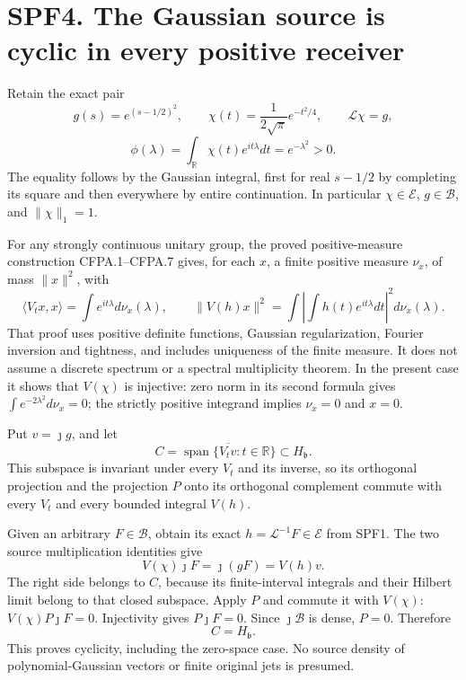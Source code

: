 \section{SPF4. The Gaussian source is cyclic in every positive
receiver}\label{spf4.-the-gaussian-source-is-cyclic-in-every-positive-receiver}

Retain the exact pair \[
g(s)=e^{(s-1/2)^2},\qquad
\chi(t)=\frac1{2\sqrt\pi}e^{-t^2/4},\qquad
\mathcal L\chi=g,
\] \[
\phi(\lambda)=\int_{\mathbb R}\chi(t)e^{it\lambda}dt
=e^{-\lambda^2}>0.
\tag{SPF4.1}
\] The equality follows by the Gaussian integral, first for real
\(s-1/2\) by completing its square and then everywhere by entire
continuation. In particular \(\chi\in\mathcal E\), \(g\in\mathcal B\),
and \(\|\chi\|_1=1\).

For any strongly continuous unitary group, the proved positive-measure
construction CFPA.1--CFPA.7 gives, for each \(x\), a finite positive
measure \(\nu_x\), of mass \(\|x\|^2\), with \[
\langle V_tx,x\rangle=\int e^{it\lambda}d\nu_x(\lambda),
\qquad
\|V(h)x\|^2=\int\left|\int h(t)e^{it\lambda}dt\right|^2d\nu_x(\lambda).
\tag{SPF4.2}
\] That proof uses positive definite functions, Gaussian regularization,
Fourier inversion and tightness, and includes uniqueness of the finite
measure. It does not assume a discrete spectrum or a spectral
multiplicity theorem. In the present case it shows that \(V(\chi)\) is
injective: zero norm in its second formula gives
\(\int e^{-2\lambda^2}d\nu_x=0\); the strictly positive integrand
implies \(\nu_x=0\) and \(x=0\).

Put \(v=\jmath g\), and let \[
C=\overline{\operatorname{span}\{V_tv:t\in\mathbb R\}}
\subset H_{\mathfrak b}.
\tag{SPF4.3}
\] This subspace is invariant under every \(V_t\) and its inverse, so
its orthogonal projection and the projection \(P\) onto its orthogonal
complement commute with every \(V_t\) and every bounded integral
\(V(h)\).

Given an arbitrary \(F\in\mathcal B\), obtain its exact
\(h=\mathcal L^{-1}F\in\mathcal E\) from SPF1. The two source
multiplication identities give \[
V(\chi)\jmath F=\jmath(gF)=V(h)v.
\tag{SPF4.4}
\] The right side belongs to \(C\), because its finite-interval
integrals and their Hilbert limit belong to that closed subspace. Apply
\(P\) and commute it with \(V(\chi)\): \(V(\chi)P\jmath F=0\).
Injectivity gives \(P\jmath F=0\). Since \(\jmath\mathcal B\) is dense,
\(P=0\). Therefore \[
\boxed{C=H_{\mathfrak b}.}
\tag{SPF4.5}
\] This proves cyclicity, including the zero-space case. No source
density of polynomial-Gaussian vectors or finite original jets is
presumed.

